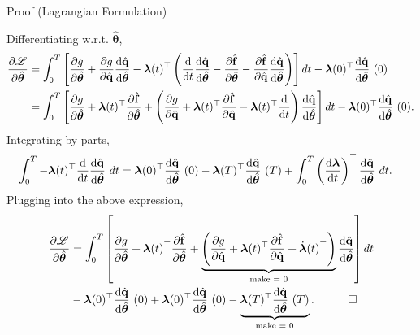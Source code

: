 \begin{frame}{Proof (Lagrangian Formulation)}

{\scriptsize
Differentiating w.r.t. $\hat{\bm{\theta}}$,
\begin{align*}
    \pdv{\mathscr{L}}{\hat{\bm{\theta}}} &= \int_0^T\left[ \pdv{g}{\hat{\bm{\theta}}} + \pdv{g}{\hat{\mathbf{q}}} \dv{\hat{\mathbf{q}}}{\hat{\bm{\theta}}} - \bm{\lambda}(t)^{\top} \left( \dv{t}\dv{\hat{\mathbf{q}}}{\hat{\bm{\theta}}} - \pdv{\hat{\mathbf{f}}}{\hat{\bm{\theta}}} - \pdv{\hat{\mathbf{f}}}{\hat{\mathbf{q}}}\dv{\hat{\mathbf{q}}}{\hat{\bm{\theta}}} \right) \right] dt - \bm{\lambda}(0)^{\top}\dv{\hat{\mathbf{q}}}{\hat{\bm{\theta}}}~(0)\notag\\
    &= \int_0^T \left[\pdv{g}{\hat{\bm{\theta}}} + \bm{\lambda}(t)^{\top} \pdv{\hat{\mathbf{f}}}{\hat{\bm{\theta}}}+ \left( \pdv{g}{\hat{\mathbf{q}}} + \bm{\lambda}(t)^{\top}\pdv{\hat{\mathbf{f}}}{\hat{\mathbf{q}}}-\bm{\lambda}(t)^{\top}\dv{t} \right)\dv{\hat{\mathbf{q}}}{\hat{\bm{\theta}}} \right]dt- \bm{\lambda}(0)^{\top}\dv{\hat{\mathbf{q}}}{\hat{\bm{\theta}}}~(0). 
\end{align*}
Integrating by parts,
\begin{align*}
    \int_0^T -\bm{\lambda}(t)^{\top}\dv{t}\dv{\hat{\mathbf{q}}}{\hat{\bm{\theta}}}~dt &= \bm{\lambda}(0)^{\top}\dv{\hat{\mathbf{q}}}{\hat{\bm{\theta}}}~(0) - \bm{\lambda}(T)^{\top}\dv{\hat{\mathbf{q}}}{\hat{\bm{\theta}}}~(T) + \int_0^T \left( \dv{\bm{\lambda}}{t}\right)^{\top}\dv{\hat{\mathbf{q}}}{\hat{\bm{\theta}}}~dt.
\end{align*}
Plugging into the above expression,
\begin{align*}
   \pdv{\mathscr{L}}{\hat{\bm{\theta}}} &= \int_0^T\left[ \pdv{g}{\hat{\bm{\theta}}} + \bm{\lambda}(t)^{\top} \pdv{\hat{\mathbf{f}}}{\hat{\bm{\theta}}} + \underbrace{\left( \pdv{g}{\hat{\mathbf{q}}} + \bm{\lambda}(t)^{\top}\pdv{\hat{\mathbf{f}}}{\hat{\mathbf{q}}}+ \dot{\bm{\lambda}}(t)^{\top}\right)}_{\text{make = 0}} \dv{\hat{\mathbf{q}}}{\hat{\bm{\theta}}} \right]dt \\
   & - \bm{\lambda}(0)^{\top}\dv{\hat{\mathbf{q}}}{\hat{\bm{\theta}}}~(0)+\bm{\lambda}(0)^{\top}\dv{\hat{\mathbf{q}}}{\hat{\bm{\theta}}}~(0) - \underbrace{\bm{\lambda}(T)^{\top}\dv{\hat{\mathbf{q}}}{\hat{\bm{\theta}}}~(T)}_{\text{make = 0}}.\quad\qed
\end{align*}

}

\end{frame}


